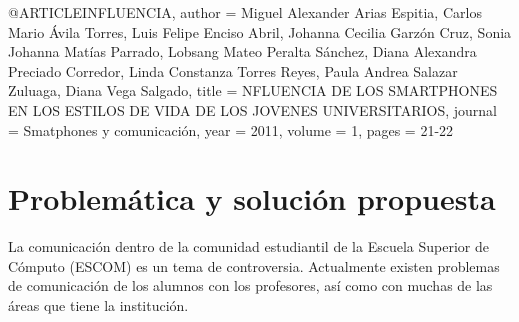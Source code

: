 	@ARTICLE{INFLUENCIA,
		author = {Miguel Alexander Arias Espitia, Carlos Mario Ávila Torres, Luis Felipe Enciso
			Abril, Johanna Cecilia Garzón Cruz, Sonia Johanna Matías Parrado, Lobsang
			Mateo Peralta Sánchez, Diana Alexandra Preciado Corredor, Linda
			Constanza Torres Reyes, Paula Andrea Salazar Zuluaga, Diana Vega
			Salgado},
		title = {NFLUENCIA DE LOS SMARTPHONES EN LOS ESTILOS DE VIDA DE LOS
			JOVENES UNIVERSITARIOS},
		journal = {Smatphones y comunicación},
		year = {2011},
		volume = {1},
		pages = {21-22}
	}
	\section{Problemática y solución propuesta}
		La comunicación dentro de la comunidad estudiantil de la Escuela Superior de Cómputo (ESCOM) es un tema de controversia. Actualmente existen problemas de comunicación de los alumnos con los profesores, así como con muchas de las áreas que tiene la institución.\\
	
